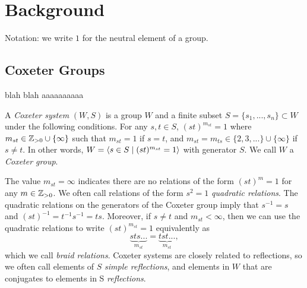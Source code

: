 \chapter{Background}


Notation: we write $1$ for the neutral element of a group.

\section{Coxeter Groups}

blah blah \cite{einstein}aaaaaaaaaa

\begin{definition}
    A \textit{Coxeter system} $(W,S)$ is a group $W$ and a finite subset $S = \{s_1, ..., s_n\} \subset W$ under the following conditions. For any $s,t \in S$, $(st)^{m_{st}} = 1$ where $m_{st} \in \mathbb{Z}_{>0}\cup\{\infty\}$ such that  $m_{st} = 1$ if $s = t$, and $m_{st} = m_{ts} \in \{2,3,...\} \cup \{\infty\}$ if $s \neq t$. In other words, $W = {\left\langle s \in S \mathrel{|} (st)^{m_{st}} = 1 \right\rangle}$ with generator $S$. We call $W$ a \textit{Coxeter group}.
\end{definition}

The value $m_{st} = \infty$ indicates there are no relations of the form $(st)^{m} = 1$ for any $m \in \mathbb{Z}_{>0}$. We often call relations of the form $s^2 = 1$ \textit{quadratic relations}. The quadratic relations on the generators of the Coxeter group imply that $s^{-1} = s$ and $(st)^{-1} = t^{-1} s^{-1} = ts$. Moreover, if $s \neq t$ and $m_{st} < \infty$, then we can use the quadratic relations to write $(st)^{m_{st}} = 1$ equivalently as
\[
    \underbrace{sts...}_{m_{st}} = \underbrace{tst...}_{m_{st}},
\]
which we call \textit{braid relations}.
Coxeter systems are closely related to reflections, so we often call elements of $S$ \textit{simple reflections}, and elements in $W$ that are conjugates to elements in S \textit{reflections}.

